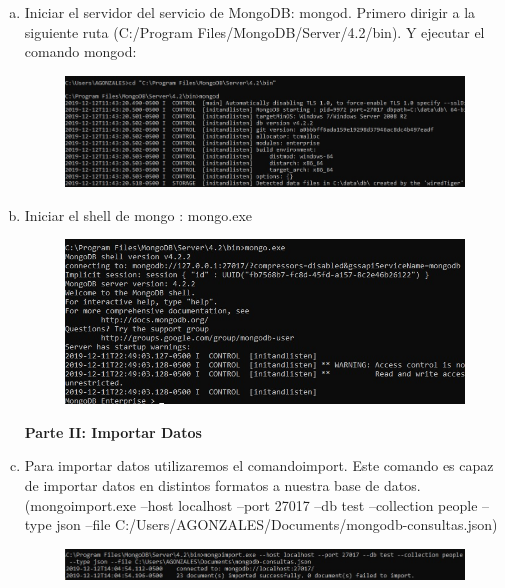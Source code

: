 \documentclass[preprint,12pt]{elsarticle}
\begin{document}
\begin{enumerate}[a)]
\item Iniciar el servidor del servicio de MongoDB: mongod. Primero dirigir a la siguiente ruta (C:/Program Files/MongoDB/Server/4.2/bin). Y ejecutar el comando mongod:
\begin{figure}[htb]
	\begin{center}
		\includegraphics[width=13cm]{./IMAGENES/Mongo04}
	\end{center}
\end{figure}

\item Iniciar el shell de mongo : mongo.exe
\begin{figure}[htb]
	\begin{center}
		\includegraphics[width=13cm]{./IMAGENES/Mongo05}
	\end{center}
\end{figure}

\textbf{Parte II: Importar Datos}
\item Para importar datos utilizaremos el comandoimport. Este comando es capaz de importar datos en distintos formatos a nuestra base de datos.\newline 
(mongoimport.exe --host localhost --port 27017 --db test --collection people --type json --file C:/Users/AGONZALES/Documents/mongodb-consultas.json)
\begin{figure}[htb]
	\begin{center}
		\includegraphics[width=13cm]{./IMAGENES/Mongo07}
	\end{center}
\end{figure}


\end{enumerate}
\end{document}
